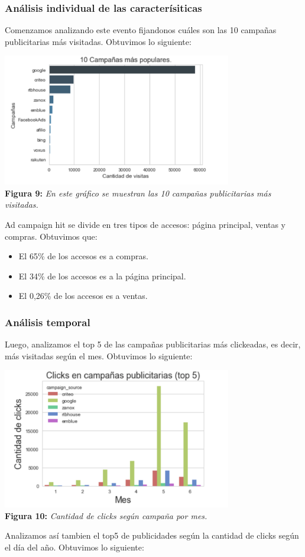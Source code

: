 \documentclass[titlepage,a4paper]{article}
\begin{document}
	\subsubsection{Análisis individual de las caracterísiticas}
	Comenzamos analizando este evento fijandonos cuáles son las 10 campañas publicitarias más visitadas. Obtuvimos lo siguiente:
	\begin{center}
	\includegraphics[width=10cm] {10campaniasmasPopulares.jpg}\\
	\textbf{Figura 9:}  \textit{En este gráfico se muestran las 10 campañas publicitarias más visitadas.  }
	\end{center}
	Ad campaign hit se divide en tres tipos de accesos: página principal, ventas y compras. Obtuvimos que: 
	\begin{itemize}
	\item El 65\% de los accesos es a compras.
	\item El 34\% de los accesos es a la página principal.
	\item El 0,26\% de los accesos es a ventas. 
	\end{itemize}


	\subsubsection{Análisis temporal}
	Luego, analizamos el top 5 de las campañas publicitarias más clickeadas, es decir, más visitadas según el mes. Obtuvimos lo siguiente: 
	\begin{center}
	\includegraphics[width=10cm] {top5campaniasPublicitariasMasImportantesSegunMes.jpg}\\
	\textbf{Figura 10:}  \textit{Cantidad de clicks según campaña por mes.}
	\end{center}
	Analizamos así tambien el top5 de publicidades según la cantidad de clicks según el día del año. Obtuvimos lo siguiente:
\end{document}

